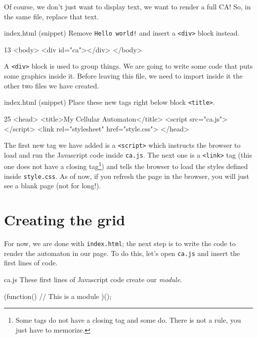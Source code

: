 Of course, we don't just want to display text, we want to render a full CA! So, in the same file, replace
that text.

\begin{programcode}{index.html (snippet)}
Remove \texttt{Hello world!} and insert a \texttt{<div>} block instead.
\begin{codehtmlh1}{1}{3}
<body>
  <div id="ca"></div>
</body>
\end{codehtmlh1}
\end{programcode}

A \texttt{<div>} block is used to group things. We are going to write some code that puts some graphics
inside it. Before leaving this file, we need to import inside it the other two files we have created.

\begin{programcode}{index.html (snippet)}
Place these new tags right below block \texttt{<title>}.
\begin{codehtmlh1}{2}{5}
<head>
  <title>My Cellular Automaton</title>
  <script src="ca.js"></script>
  <link rel="stylesheet" href="style.css">
</head>
\end{codehtmlh1}
\end{programcode}

The first new tag we have added is a \texttt{<script>} which instructs the browser to load and run the
Javascript code inside \texttt{ca.js}. The next one is a \texttt{<link>} tag (this one does not have a closing
tag\footnote{Some tags do not have a closing tag and some do. There is not a rule, you just have
to memorize.})
and tells the browser to load the styles defined inside \texttt{style.css}. As of now, if you refresh the
page in the browser, you will just see a blank page (not for long!).

\section{Creating the grid}
For now, we are done with \texttt{index.html}; the next step is to write the code to render the automaton
in our page. To do this, let's open \texttt{ca.js} and insert the first lines of code.

\begin{programcode}{ca.js}
These first lines of Javascript code create our \textit{module}.
\begin{code}
(function(){
  // This is a module
})();
\end{code}
\end{programcode}

